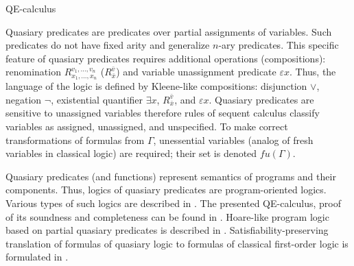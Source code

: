 \begin{entry}{QE-calculus}
\begin{calculus}
\end{calculus}


\begin{clarifications}

Quasiary predicates are predicates over partial assignments of variables. Such predicates do not have fixed arity and generalize $n$-ary predicates. This specific feature of quasiary predicates requires additional operations (compositions): renomination $R_{x_{1} ,...,x_{n} }^{v_{1} ,...,v_{n} }$ ($R^{\bar v}_{\bar x}$) and  variable unassignment  predicate $\varepsilon x$. Thus, the language of the logic is defined by Kleene-like compositions: disjunction $\vee$, negation $\neg$, existential quantifier $\exists x$,   $R^{\bar v}_{\bar x}$, and $\varepsilon x$. Quasiary predicates are sensitive to unassigned variables therefore rules of sequent calculus classify variables as assigned, unassigned, and unspecified. To make correct transformations of formulas from $\Gamma$, unessential variables (analog of fresh variables in classical logic) are required; their set is denoted $fu(\Gamma)$.      


\end{clarifications}

\begin{history}
Quasiary predicates (and functions) represent semantics of programs and their components.  Thus, logics of quasiary predicates are program-oriented logics. Various types of such logics are described in \cite{NikShk2008,NikShk2013}. The presented QE-calculus, proof of its soundness and completeness can be found in \cite{NikShk2017}. Hoare-like program logic based on partial quasiary predicates is described in \cite{KNS2013}. Satisfiability-preserving translation of formulas of quasiary logic to formulas of classical first-order logic is formulated in \cite{NikTym2012}.


\end{history}





\end{entry}
